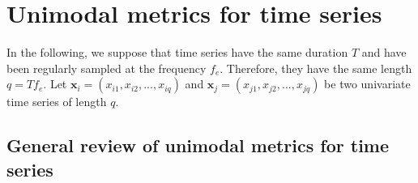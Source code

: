 \section{Unimodal metrics for time series}
\label{sec:metric_time_series}
In the following, we suppose that time series have the same duration $T$ and have been regularly sampled at the frequency $f_e$. Therefore, they have the same length $q=Tf_e$. Let $\textbf{x}_i=(x_{i1}, x_{i2}, ..., x_{iq})$ and $\textbf{x}_j=(x_{j1}, x_{j2}, ..., x_{jq})$ be two univariate time series of length $q$. 

%



\subsection{General review of unimodal metrics for time series}

